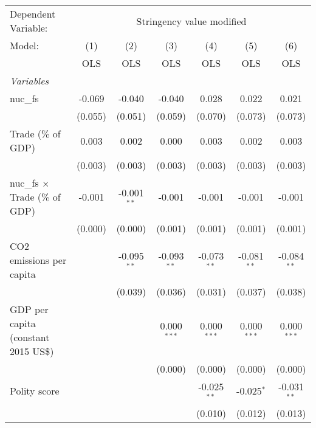 
\begingroup
\centering
\begin{tabular}{lcccccc}
   \toprule
   Dependent Variable: & \multicolumn{6}{c}{Stringency value modified}\\
   Model:                                & (1)     & (2)           & (3)           & (4)           & (5)           & (6)\\  
                                         &  OLS    & OLS           & OLS           & OLS           & OLS           & OLS\\  
   \midrule
   \emph{Variables}\\
   nuc\_fs                               & -0.069  & -0.040        & -0.040        & 0.028         & 0.022         & 0.021\\   
                                         & (0.055) & (0.051)       & (0.059)       & (0.070)       & (0.073)       & (0.073)\\   
   Trade (\% of GDP)                     & 0.003   & 0.002         & 0.000         & 0.003         & 0.002         & 0.003\\   
                                         & (0.003) & (0.003)       & (0.003)       & (0.003)       & (0.003)       & (0.003)\\   
   nuc\_fs $\times$ Trade (\% of GDP)    & -0.001  & -0.001$^{**}$ & -0.001        & -0.001        & -0.001        & -0.001\\   
                                         & (0.000) & (0.000)       & (0.001)       & (0.001)       & (0.001)       & (0.001)\\   
   CO2 emissions per capita              &         & -0.095$^{**}$ & -0.093$^{**}$ & -0.073$^{**}$ & -0.081$^{**}$ & -0.084$^{**}$\\   
                                         &         & (0.039)       & (0.036)       & (0.031)       & (0.037)       & (0.038)\\   
   GDP per capita (constant 2015 US\$)   &         &               & 0.000$^{***}$ & 0.000$^{***}$ & 0.000$^{***}$ & 0.000$^{***}$\\   
                                         &         &               & (0.000)       & (0.000)       & (0.000)       & (0.000)\\   
   Polity score                          &         &               &               & -0.025$^{**}$ & -0.025$^{*}$  & -0.031$^{**}$\\   
                                         &         &               &               & (0.010)       & (0.012)       & (0.013)\\   

\end{tabular}
